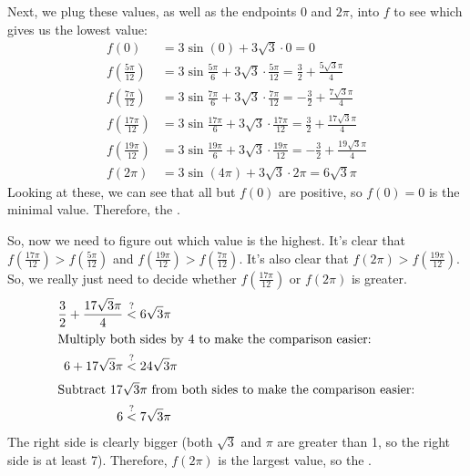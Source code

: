 \documentclass{article}
\begin{document}
\begin{enumerate}
\begin{enumerate}
\begin{solution}
      Next, we plug these values, as well as the endpoints $0$ and
      $2 \pi$, into $f$ to see which gives us the lowest value:
      \begin{align*}
        f(0) &= 3 \sin (0) + 3 \sqrt{3} \cdot 0 = 0 \\
        f \left( \frac{5 \pi}{12} \right) &= 3 \sin \frac{5 \pi}{6} + 3
        \sqrt{3} \cdot \frac{5 \pi}{12} = \frac{3}{2} + \frac{5 \sqrt{3}
          \pi}{4} \\
        f \left( \frac{7 \pi}{12} \right) &= 3 \sin \frac{7 \pi}{6} + 3
        \sqrt{3} \cdot \frac{7 \pi}{12} = - \frac{3}{2} + \frac{7 \sqrt{3}
          \pi}{4} \\
        f \left( \frac{17 \pi}{12} \right) &= 3 \sin \frac{17 \pi}{6} + 3
        \sqrt{3} \cdot \frac{17 \pi}{12} = \frac{3}{2} + \frac{17 \sqrt{3} 
          \pi}{4} \\
        f \left( \frac{19 \pi}{12} \right) &= 3 \sin \frac{19 \pi}{6} + 3
        \sqrt{3} \cdot \frac{19 \pi}{12} = - \frac{3}{2} + \frac{19
          \sqrt{3} \pi}{4} \\
        f(2 \pi) &= 3 \sin (4 \pi) + 3 \sqrt{3} \cdot 2 \pi = 6 \sqrt{3}
        \pi 
      \end{align*}
      Looking at these, we can see that all but $f(0)$ are positive, so
      $f(0) = 0$ is the minimal value.  Therefore, the .

\iffalse
      So, now we need to figure out which value is the highest.  It's
      clear that $f \left( \frac{17 \pi}{12} \right) > f \left( \frac{5
          \pi}{12} \right)$ and $f \left( \frac{19 \pi}{12} \right) > f
      \left( \frac{7 \pi}{12} \right)$.  It's also clear that $f (2 \pi) >
      f \left( \frac{19 \pi}{12} \right)$.  So, we really just need to
      decide whether $f \left( \frac{17 \pi}{12} \right)$ or $f(2 \pi)$ is
      greater.
      \begin{align*}
        \frac{3}{2} + \frac{17 \sqrt{3} \pi}{4} & \stackrel{?}{<} 6
        \sqrt{3} \pi \\
        \intertext{Multiply both sides by $4$ to make the comparison
          easier:}
        6 + 17 \sqrt{3} \pi & \stackrel{?}{<} 24 \sqrt{3} \pi \\
        \intertext{Subtract $17 \sqrt{3} \pi$ from both sides to make the
          comparison easier:}
        6 & \stackrel{?}{<} 7 \sqrt{3} \pi 
      \end{align*}
      The right side is clearly bigger (both $\sqrt{3}$ and $\pi$ are
      greater than 1, so the right side is at least 7).  Therefore, $f (2
      \pi)$ is the largest value, so the .


\end{solution}
\end{enumerate}
\end{enumerate}
\end{document}
